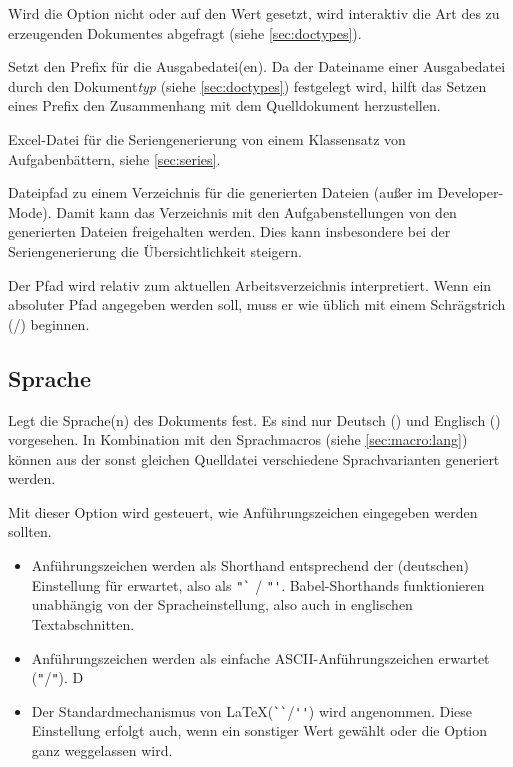 \documentclass[
load=osgexam,
babel=ngerman
]{skdoc}
\begin{document}
Wird die Option nicht oder auf den Wert  gesetzt, wird interaktiv die Art des zu erzeugenden Dokumentes
abgefragt (siehe \ref{sec:doctypes}).
\medskip

Setzt den Prefix für die Ausgabedatei(en). Da der Dateiname einer Ausgabedatei durch den Dokument\emph{typ} (siehe \ref{sec:doctypes}) festgelegt
wird, hilft das Setzen eines Prefix den Zusammenhang mit dem Quelldokument herzustellen.
\medskip

 Excel-Datei für die Seriengenerierung von einem Klassensatz von
Aufgabenbättern, siehe \ref{sec:series}.
\medskip

Dateipfad zu einem Verzeichnis für die generierten Dateien (außer im Developer-Mode). Damit kann das Verzeichnis mit den
Aufgabenstellungen von den generierten Dateien freigehalten werden. Dies kann insbesondere bei der Seriengenerierung die
Übersichtlichkeit steigern.

Der Pfad wird relativ zum aktuellen Arbeitsverzeichnis interpretiert. Wenn ein absoluter Pfad angegeben werden soll,
muss er wie üblich mit einem Schrägstrich (/) beginnen.
\medskip

\subsection*{Sprache}
Legt die Sprache(n) des Dokuments fest. Es sind nur Deutsch () und Englisch () vorgesehen. In
Kombination mit den Sprachmacros (siehe \ref{sec:macro:lang}) können aus der sonst gleichen Quelldatei verschiedene
Sprachvarianten generiert werden.\medskip

Mit dieser Option wird gesteuert, wie Anführungszeichen eingegeben werden sollten.
\begin{itemize}[nosep]
  \item [\opt{babelshorthands}] Anführungszeichen werden als Shorthand entsprechend der (deutschen) Einstellung für
     erwartet, also als \verb!"`! / \verb!"'!. Babel-Shorthands funktionieren unabhängig von der
    Spracheinstellung, also auch in englischen Textabschnitten.
  \item [\opt{ascii}] Anführungszeichen werden als einfache ASCII-Anführungszeichen erwartet (\verb!"!/\verb!"!). D
  \item [\opt{latex}]  Der Standardmechanismus von \LaTeX (\verb!``!/\verb!''!) wird angenommen. Diese Einstellung
    erfolgt auch, wenn ein sonstiger Wert gewählt oder die Option ganz weggelassen wird.
\end{itemize}
\medskip
\end{document}
